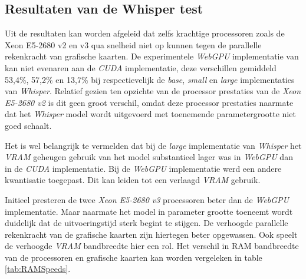 
\begin{figure}
    \centering
    
\end{figure}


\subsection{Resultaten van de Whisper test}

Uit de resultaten kan worden afgeleid dat zelfs krachtige processoren zoals de Xeon E5-2680 v2 en v3 qua snelheid niet op kunnen tegen de parallelle rekenkracht van grafische kaarten. De experimentele \textit{WebGPU} implementatie van \textcite{Fleetwood2024} kan niet evenaren aan de \textit{CUDA} implementatie, deze verschillen gemiddeld 53,4\%, 57,2\% en 13,7\% bij respectievelijk de \textit{base}, \textit{small} en \textit{large} implementaties van \textit{Whisper}. Relatief gezien ten opzichte van de processor prestaties van de \textit{Xeon E5-2680 v2} is dit geen groot verschil, omdat deze processor prestaties naarmate dat het \textit{Whisper} model wordt uitgevoerd met toenemende parametergrootte niet goed schaalt.

\bigbreak{}

Het is wel belangrijk te vermelden dat bij de \textit{large} implementatie van \textit{Whisper} het \textit{VRAM} geheugen gebruik van het model substantieel lager was in \textit{WebGPU} dan in de \textit{CUDA} implementatie. Bij de \textit{WebGPU} implementatie werd een andere kwantisatie toegepast. Dit kan leiden tot een verlaagd \textit{VRAM} gebruik.

\bigbreak{}

Initieel presteren de twee \textit{Xeon E5-2680 v3} processoren beter dan de \textit{WebGPU} implementatie. Maar naarmate het model in parameter grootte toeneemt wordt duidelijk dat de uitvoeringstijd sterk begint te stijgen. De verhoogde parallelle rekenkracht van de grafische kaarten zijn hiertegen beter opgewassen. Ook speelt de verhoogde \textit{VRAM} bandbreedte hier een rol. Het verschil in RAM bandbreedte van de processoren en grafische kaarten kan worden vergeleken in table \ref{tab:RAMSpeeds}. 

